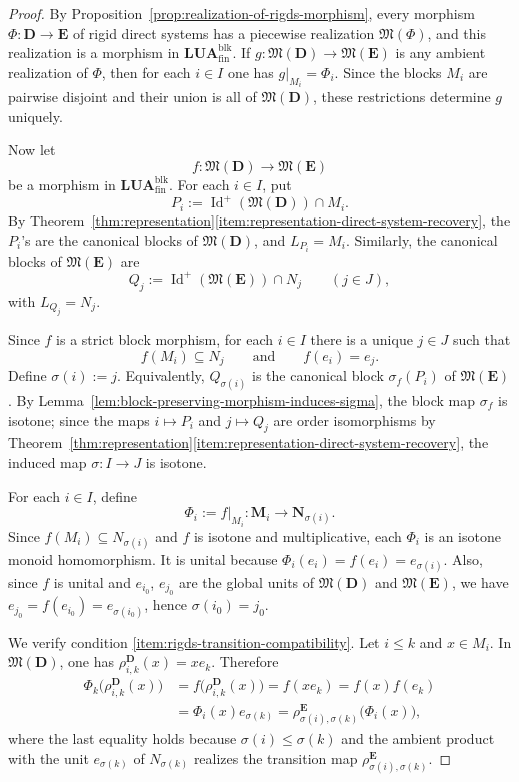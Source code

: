 \documentclass[pdflatex,sn-mathphys-num]{sn-jnl}
\theoremstyle{thmstyleone}%
\theoremstyle{thmstyletwo}%
\theoremstyle{thmstylethree}%
\newcommand{\PosId}{\operatorname{Id}^{+}}
\newcommand{\layer}[1]{L_{#1}}
\begin{document}
\begin{proof}
By Proposition~\ref{prop:realization-of-rigds-morphism}, every morphism \(\Phi\colon\mathbf D\to\mathbf E\) of rigid direct systems has a piecewise realization \(\mathfrak M(\Phi)\), and this realization is a morphism in \(\mathbf{LUA}^{\mathrm{blk}}_{\mathrm{fin}}\).
If \(g\colon \mathfrak M(\mathbf D)\to \mathfrak M(\mathbf E)\) is any ambient realization of \(\Phi\), then for each \(i\in I\) one has \(g|_{M_i}=\Phi_i\).
Since the blocks \(M_i\) are pairwise disjoint and their union is all of \(\mathfrak M(\mathbf D)\), these restrictions determine \(g\) uniquely.

Now let
\[
f\colon \mathfrak M(\mathbf D)\to \mathfrak M(\mathbf E)
\]
be a morphism in \(\mathbf{LUA}^{\mathrm{blk}}_{\mathrm{fin}}\).
For each \(i\in I\), put
\[
P_i:=\PosId(\mathfrak M(\mathbf D))\cap M_i.
\]
By Theorem~\ref{thm:representation}\ref{item:representation-direct-system-recovery}, the \(P_i\)'s are the canonical blocks of \(\mathfrak M(\mathbf D)\), and \(\layer{P_i}=M_i\).
Similarly, the canonical blocks of \(\mathfrak M(\mathbf E)\) are
\[
Q_j:=\PosId(\mathfrak M(\mathbf E))\cap N_j
\qquad(j\in J),
\]
with \(\layer{Q_j}=N_j\).

Since \(f\) is a strict block morphism, for each \(i\in I\) there is a unique \(j\in J\) such that
\[
f(M_i)\subseteq N_j
\qquad\text{and}\qquad
f(e_i)=e_j.
\]
Define \(\sigma(i):=j\).
Equivalently, \(Q_{\sigma(i)}\) is the canonical block \(\sigma_f(P_i)\) of \(\mathfrak M(\mathbf E)\).
By Lemma~\ref{lem:block-preserving-morphism-induces-sigma}, the block map \(\sigma_f\) is isotone; since the maps \(i\mapsto P_i\) and \(j\mapsto Q_j\) are order isomorphisms by Theorem~\ref{thm:representation}\ref{item:representation-direct-system-recovery}, the induced map \(\sigma\colon I\to J\) is isotone.

For each \(i\in I\), define
\[
\Phi_i:=f|_{M_i}\colon \mathbf M_i\to \mathbf N_{\sigma(i)}.
\]
Since \(f(M_i)\subseteq N_{\sigma(i)}\) and \(f\) is isotone and multiplicative, each \(\Phi_i\) is an isotone monoid homomorphism.
It is unital because \(\Phi_i(e_i)=f(e_i)=e_{\sigma(i)}\).
Also, since \(f\) is unital and \(e_{i_0}\), \(e_{j_0}\) are the global units of \(\mathfrak M(\mathbf D)\) and \(\mathfrak M(\mathbf E)\), we have \(e_{j_0}=f(e_{i_0})=e_{\sigma(i_0)}\), hence \(\sigma(i_0)=j_0\).

We verify condition \ref{item:rigds-transition-compatibility}.
Let \(i\le k\) and \(x\in M_i\).
In \(\mathfrak M(\mathbf D)\), one has \(\rho^{\mathbf D}_{i,k}(x)=xe_k\).
Therefore
\begin{align*}
\Phi_k\bigl(\rho^{\mathbf D}_{i,k}(x)\bigr)
&=
f\bigl(\rho^{\mathbf D}_{i,k}(x)\bigr)
=
f(xe_k)
=
f(x)f(e_k)\\
&=
\Phi_i(x)e_{\sigma(k)}
=
\rho^{\mathbf E}_{\sigma(i),\sigma(k)}\!\bigl(\Phi_i(x)\bigr),
\end{align*}
where the last equality holds because \(\sigma(i)\le\sigma(k)\) and the ambient product with the unit \(e_{\sigma(k)}\) of \(N_{\sigma(k)}\) realizes the transition map \(\rho^{\mathbf E}_{\sigma(i),\sigma(k)}\).


\end{proof}
\end{document}

